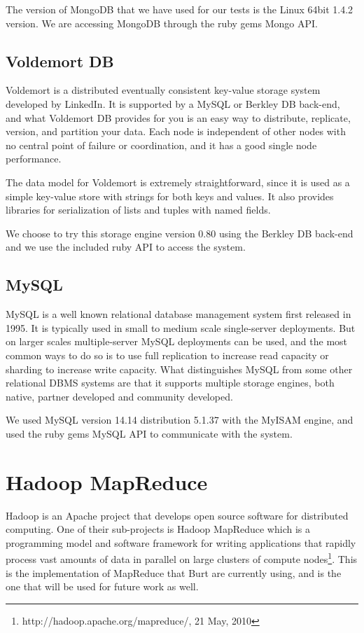 The version of MongoDB that we have used for our tests is the Linux 64bit 1.4.2 version. We are accessing MongoDB through the ruby gems Mongo API.
\subsection{Voldemort DB}
Voldemort is a distributed eventually consistent key-value storage system developed by LinkedIn. It is supported by a MySQL or Berkley DB back-end, and what Voldemort DB provides for you is an easy way to distribute, replicate, version, and partition your data. Each node is independent of other nodes with no central point of failure or coordination, and it has a good single node performance.

The data model for Voldemort is extremely straightforward, since it is used as a simple key-value store with strings for both keys and values. It also provides libraries for serialization of lists and tuples with named fields.

We choose to try this storage engine version 0.80 using the Berkley DB back-end and we use the included ruby API to access the system.
\subsection{MySQL}
MySQL is a well known relational database management system first released in 1995. It is typically used in small to medium scale single-server deployments. But on larger scales multiple-server MySQL deployments can be used, and the most common ways to do so is to use full replication to increase read capacity or sharding to increase write capacity. What distinguishes MySQL from some other relational DBMS systems are that it supports multiple storage engines, both native, partner developed and community developed.

We used MySQL version 14.14 distribution 5.1.37 with the MyISAM engine, and used the ruby gems MySQL API to communicate with the system.
\section{Hadoop MapReduce} \label{sec:Hadoop MapReduce}
Hadoop is an Apache project that develops open source software for distributed computing. One of their sub-projects is Hadoop MapReduce which is a  programming model and software framework for writing applications that rapidly process vast amounts of data in parallel on large clusters of compute nodes\footnote{http://hadoop.apache.org/mapreduce/, 21 May, 2010}. This is the implementation of MapReduce that Burt are currently using, and is the one that will be used for future work as well.

